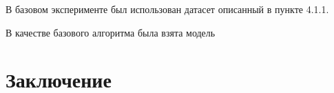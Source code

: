 \documentclass[12pt]{article}
\begin{document}
В базовом эксперименте был использован датасет описанный в пункте 4.1.1.


В качестве базового алгоритма была взята модель 




\newpage
\section*{Заключение}


\newpage
{}


\end{document}
